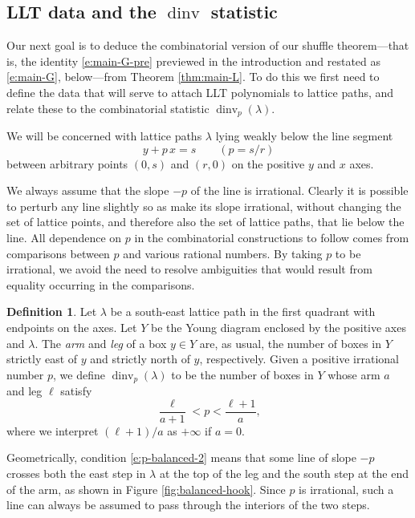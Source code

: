 \documentclass[12pt]{amsart}
\theoremstyle{definition}
\newtheorem{defn}[thm]{Definition}
\theoremstyle{remark}
\DeclareMathOperator{\dinv}{dinv}
\begin{document}
\subsection{LLT data and the \texorpdfstring{$\dinv $} {dinv}
statistic}
\label{ss:dinv-data}

Our next goal is to deduce the combinatorial version of our shuffle
theorem---that is, the identity \eqref{e:main-G-pre} previewed in the
introduction and restated as \eqref{e:main-G}, below---from Theorem
\ref{thm:main-L}.  To do this we first need to define the data that
will serve to attach LLT polynomials to lattice paths, and relate
these to the combinatorial statistic $\dinv _{p}(\lambda )$.

We will be concerned with lattice paths $\lambda $ lying weakly below
the line segment
\begin{equation}\label{e:line}
y + p\, x= s\qquad (p = s/r)
\end{equation}
between arbitrary points $(0,s)$ and $(r,0)$ on the positive $y$ and
$x$ axes.

We always assume that the slope $-p$ of the line is irrational.
Clearly it is possible to perturb any line slightly so as make its
slope irrational, without changing the set of lattice points, and
therefore also the set of lattice paths, that lie below the line.  All
dependence on $p$ in the combinatorial constructions to follow comes
from comparisons between $p$ and various rational numbers.  By taking
$p$ to be irrational, we avoid the need to resolve ambiguities that
would result from equality occurring in the comparisons.

\begin{defn}\label{def:dinv}
Let $\lambda $ be a south-east lattice path in the first quadrant with
endpoints on the axes.  Let $Y$ be the Young diagram enclosed by the
positive axes and $\lambda $.  The {\em arm} and {\em leg} of a box
$y\in Y$ are, as usual, the number of boxes in $Y$ strictly east of
$y$ and strictly north of $y$, respectively.  Given a positive
irrational number $p$, we define $\dinv _{p}(\lambda )$ to be the
number of boxes in $Y$ whose arm $a$ and leg $\ell$ satisfy
\begin{equation}\label{e:p-balanced-2}
\frac{\ell}{a+1}<p<\frac{\ell+1}{a},
\end{equation}
where we interpret $(\ell+1)/a$ as $+\infty $ if $a = 0$.
\end{defn}

Geometrically, condition \eqref{e:p-balanced-2} means that some line
of slope $-p$ crosses both the east step in $\lambda $ at the top of
the leg and the south step at the end of the arm, as shown in Figure
\ref{fig:balanced-hook}.  Since $p$ is irrational, such a line can
always be assumed to pass through the interiors of the two steps.
\end{document}
